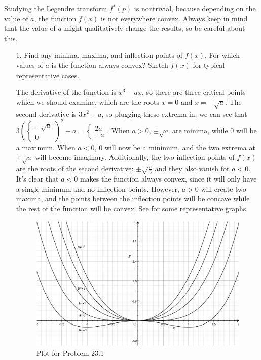 \documentclass[a4paper,twoside]{article}
\begin{document}
Studying the Legendre transform $ f^*(p) $ is nontrivial, because depending on the value of $ a $, the function $ f(x) $ is not everywhere convex. Always keep in mind that the value of $ a $ might qualitatively change the results, so be careful about this.
\begin{itemize}
    \item[1.] Find any minima, maxima, and inflection points of $ f(x) $. For which values of $ a $ is the function always convex? Sketch $ f(x) $ for typical representative cases.
        \begin{problem}
            The derivative of the function is $ x^3 - ax $, so there are three critical points which we should examine, which are the roots $ x = 0 $ and $ x = \pm \sqrt{a} $. The second derivative is $ 3 x^2 - a $, so plugging these extrema in, we can see that $ 3 \left( \begin{cases} \pm \sqrt{a} \\ 0 \end{cases} \right)^2 - a = \begin{cases} 2a \\ -a \end{cases} $. When $ a > 0 $, $ \pm \sqrt{a} $ are minima, while $ 0 $ will be a maximum. When $ a < 0 $, $ 0 $ will now be a minimum, and the two extrema at $ \pm \sqrt{a} $ will become imaginary. Additionally, the two inflection points of $ f(x) $ are the roots of the second derivative: $ \pm \sqrt{\frac{a}{3}} $ and they also vanish for $ a < 0 $. It's clear that $ a < 0 $ makes the function always convex, since it will only have a single minimum and no inflection points. However, $ a > 0 $ will create two maxima, and the points between the inflection points will be concave while the rest of the function will be convex. See  for some representative graphs.
        \end{problem}

        \begin{figure}[h]
            \centering
            \includegraphics[width=\textwidth]{Problem_23_1_Plot.eps}
            \caption{Plot for Problem 23.1}
            \label{fig:problem_23_1_plot}
        \end{figure}


\end{itemize}
\end{document}
